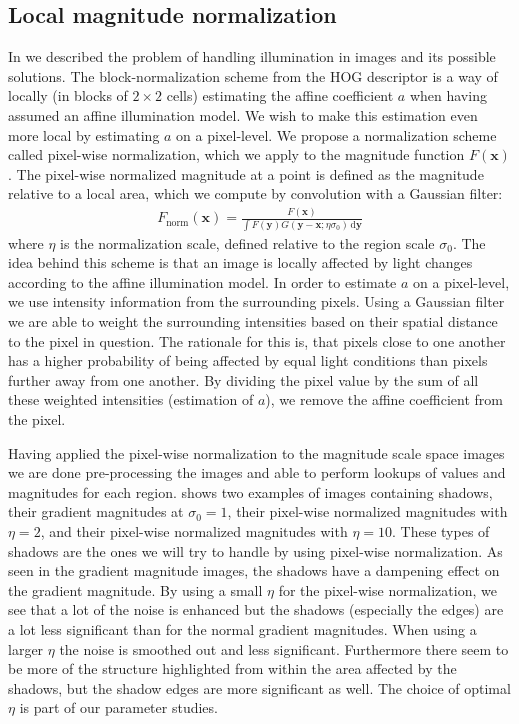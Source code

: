 \documentclass[thesis.tex]{subfiles}
\def\x{\mathbf{x}}
\def\y{\mathbf{y}}
\begin{document}
\subsection{Local magnitude normalization}
\label{sec:localMagnitudeNormalization}
%
In  we described the problem of handling illumination in images and its possible solutions. The block-normalization scheme from the HOG descriptor \cite{dalal2005histograms} is a way of locally (in blocks of $2 \times 2$ cells) estimating the affine coefficient $a$ when having assumed an affine illumination model. We wish to make this estimation even more local by estimating $a$ on a pixel-level. We propose a normalization scheme called pixel-wise normalization, which we apply to the magnitude function $F(\x)$.
The pixel-wise normalized magnitude at a point is defined as the magnitude relative to a local area, which we compute by convolution with a Gaussian filter:
%
\begin{align}
F_\text{norm}(\x) = \frac{F(\x)}{\int F(\y) G(\y - \x; \eta \sigma_0) \,\text{d} \y}
\end{align}
%
where $\eta$ is the normalization scale, defined relative to the region scale $\sigma_0$. The idea behind this scheme is that an image is locally affected by light changes according to the affine illumination model. In order to estimate $a$ on a pixel-level, we use intensity information from the surrounding pixels. Using a Gaussian filter we are able to weight the surrounding intensities based on their spatial distance to the pixel in question. The rationale for this is, that pixels close to one another has a higher probability of being affected by equal light conditions than pixels further away from one another. By dividing the pixel value by the sum of all these weighted intensities (estimation of $a$), we remove the affine coefficient from the pixel.

Having applied the pixel-wise normalization to the magnitude scale space images we are done pre-processing the images and able to perform lookups of values and magnitudes for each region.
 shows two examples of images containing shadows, their gradient magnitudes at $\sigma_0 = 1$, their pixel-wise normalized magnitudes with $\eta = 2$, and their pixel-wise normalized magnitudes with $\eta = 10$. These types of shadows are the ones we will try to handle by using pixel-wise normalization. As seen in the gradient magnitude images, the shadows have a dampening effect on the gradient magnitude. By using a small $\eta$ for the pixel-wise normalization, we see that a lot of the noise is enhanced but the shadows (especially the edges) are a lot less significant than for the normal gradient magnitudes. When using a larger $\eta$ the noise is smoothed out and less significant. Furthermore there seem to be more of the structure highlighted from within the area affected by the shadows, but the shadow edges are more significant as well. The choice of optimal $\eta$ is part of our parameter studies.
\end{document}
